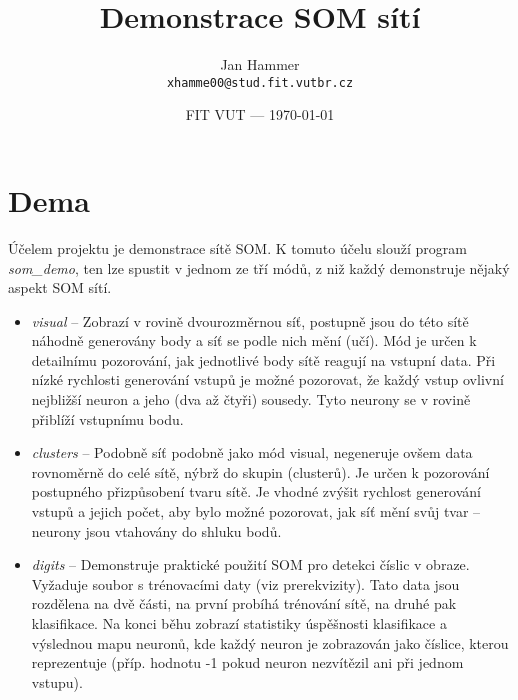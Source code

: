 \documentclass[12pt]{article}
\title{Demonstrace SOM sítí} %
\author{Jan Hammer\\ \texttt{xhamme00@stud.fit.vutbr.cz}} %
\date{FIT VUT --- \today} %
\begin{document}
\maketitle %

\section*{Dema}

Účelem projektu je demonstrace sítě SOM. K tomuto účelu slouží program \textit{som\_demo}, ten lze spustit v jednom ze tří módů, z niž každý demonstruje nějaký aspekt SOM sítí.

\begin{itemize}
	\item \textit{visual} -- Zobrazí v rovině dvourozměrnou síť, postupně jsou do této sítě náhodně generovány body a síť se podle nich mění (učí). Mód je určen k detailnímu pozorování, jak jednotlivé body sítě reagují na vstupní data. Při nízké rychlosti generování vstupů je možné pozorovat, že každý vstup ovlivní nejbližší neuron a jeho (dva až čtyři) sousedy. Tyto neurony se v rovině přiblíží vstupnímu bodu.
	\item \textit{clusters} -- Podobně síť podobně jako mód visual, negeneruje ovšem data rovnoměrně do celé sítě, nýbrž do skupin (clusterů). Je určen k pozorování postupného přizpůsobení tvaru sítě. Je vhodné zvýšit rychlost generování vstupů a jejich počet, aby bylo možné pozorovat, jak síť mění svůj tvar -- neurony jsou vtahovány do shluku bodů.
	\item \textit{digits} -- Demonstruje praktické použití SOM pro detekci číslic v obraze. Vyžaduje soubor s trénovacími daty (viz prerekvizity). Tato data jsou rozdělena na dvě části, na první probíhá trénování sítě, na druhé pak klasifikace. Na konci běhu zobrazí statistiky úspěšnosti klasifikace a výslednou mapu neuronů, kde každý neuron je zobrazován jako číslice, kterou reprezentuje (příp. hodnotu -1 pokud neuron nezvítězil ani při jednom vstupu).
\end{itemize}
\end{document}
